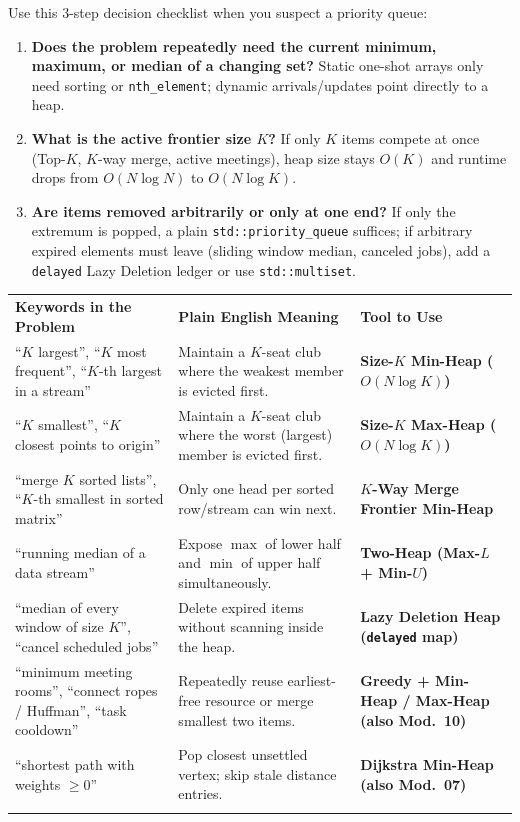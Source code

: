 \documentclass[11pt,a4paper]{article}
\theoremstyle{definition}
\begin{document}
Use this 3-step decision checklist when you suspect a priority queue:
\begin{enumerate}
    \item \textbf{Does the problem repeatedly need the current minimum, maximum, or median of a changing set?} Static one-shot arrays only need sorting or \texttt{nth\_element}; dynamic arrivals/updates point directly to a heap.
    \item \textbf{What is the active frontier size $K$?} If only $K$ items compete at once (Top-$K$, $K$-way merge, active meetings), heap size stays $O(K)$ and runtime drops from $O(N \log N)$ to $O(N \log K)$.
    \item \textbf{Are items removed arbitrarily or only at one end?} If only the extremum is popped, a plain \texttt{std::priority\_queue} suffices; if arbitrary expired elements must leave (sliding window median, canceled jobs), add a \texttt{delayed} Lazy Deletion ledger or use \texttt{std::multiset}.
\end{enumerate}

\begingroup\small{}
\begin{tabularx}{\textwidth}{>{\raggedright\arraybackslash}p{4.3cm} >{\raggedright\arraybackslash}X >{\raggedright\arraybackslash\bfseries}p{4.0cm}}
\arrayrulecolor{primaryblue}\toprule[1.2pt]
\rowcolor{primaryblue!10}
\textcolor{primaryblue}{\textbf{Keywords in the Problem}} & \textcolor{primaryblue}{\textbf{Plain English Meaning}} & \textcolor{primaryblue}{\textbf{Tool to Use}} \\
\arrayrulecolor{codeframe}\midrule[0.6pt]
``$K$ largest'', ``$K$ most frequent'', ``$K$-th largest in a stream'' & Maintain a $K$-seat club where the weakest member is evicted first. & Size-$K$ Min-Heap ($O(N \log K)$) \\
``$K$ smallest'', ``$K$ closest points to origin'' & Maintain a $K$-seat club where the worst (largest) member is evicted first. & Size-$K$ Max-Heap ($O(N \log K)$) \\
``merge $K$ sorted lists'', ``$K$-th smallest in sorted matrix'' & Only one head per sorted row/stream can win next. & $K$-Way Merge Frontier Min-Heap \\
``running median of a data stream'' & Expose $\max$ of lower half and $\min$ of upper half simultaneously. & Two-Heap (Max-$L$ + Min-$U$) \\
``median of every window of size $K$'', ``cancel scheduled jobs'' & Delete expired items without scanning inside the heap. & Lazy Deletion Heap (\texttt{delayed} map) \\
``minimum meeting rooms'', ``connect ropes / Huffman'', ``task cooldown'' & Repeatedly reuse earliest-free resource or merge smallest two items. & Greedy + Min-Heap / Max-Heap (also Mod.~10) \\
``shortest path with weights $\ge 0$'' & Pop closest unsettled vertex; skip stale distance entries. & Dijkstra Min-Heap (also Mod.~07) \\
\arrayrulecolor{primaryblue}\bottomrule[1.2pt]
\end{tabularx}\endgroup
\end{document}
